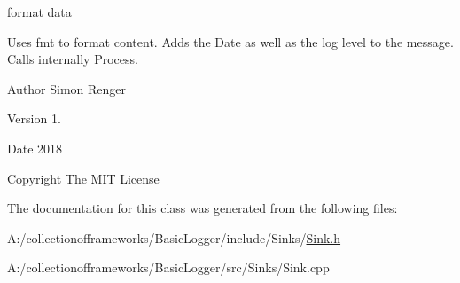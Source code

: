 format data 

Uses fmt to format content. Adds the Date as well as the log level to the message. Calls internally {\ttfamily Process}. \begin{DoxyAuthor}{Author}
Simon Renger 
\end{DoxyAuthor}
\begin{DoxyVersion}{Version}
1. 
\end{DoxyVersion}
\begin{DoxyDate}{Date}
2018 
\end{DoxyDate}
\begin{DoxyCopyright}{Copyright}
The M\+IT License 
\end{DoxyCopyright}


The documentation for this class was generated from the following files\+:\begin{DoxyCompactItemize}
\item 
A\+:/collectionofframeworks/\+Basic\+Logger/include/\+Sinks/\hyperlink{_sink_8h}{Sink.\+h}\item 
A\+:/collectionofframeworks/\+Basic\+Logger/src/\+Sinks/Sink.\+cpp\end{DoxyCompactItemize}
